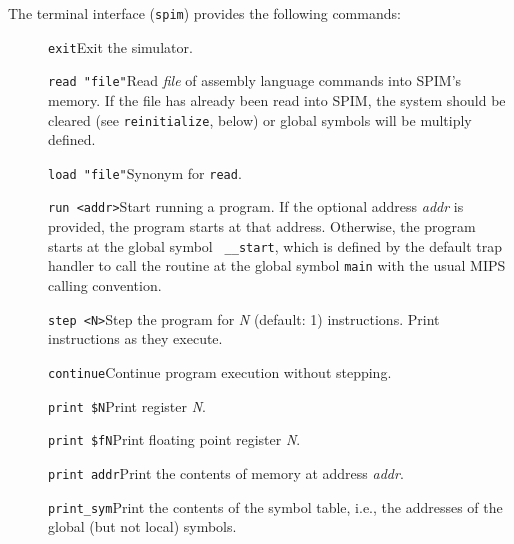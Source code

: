 The terminal interface ({\tt spim}) provides the following commands:
\begin{description}
  \item [] {\tt exit}\newline Exit the simulator.

  \item [] {\tt read "file"}\newline Read {\em file\/} of assembly
language commands into SPIM's memory.  If the file has already been
read into SPIM, the system should be cleared (see {\tt reinitialize},
below) or global symbols will be multiply defined.

  \item [] {\tt load "file"}\newline Synonym for {\tt read}.

  \item [] {\tt run <addr>}\newline Start running a program.  If the
optional address {\em addr\/} is provided, the program starts at that
address.  Otherwise, the program starts at the global symbol {\tt
\_\_start}, which is defined by the default trap handler to call the
routine at the global symbol {\tt main} with the usual MIPS calling
convention.

  \item [] {\tt step <N>}\newline Step the program for {\em N\/}
(default: 1) instructions.  Print instructions as they execute.

  \item [] {\tt continue}\newline Continue program execution without
stepping.

  \item [] {\tt print \$N}\newline Print register {\em N\/}.

  \item [] {\tt print \$fN}\newline Print floating point register {\em
N\/}.

  \item [] {\tt print addr}\newline Print the contents of memory at
address {\em addr\/}.

  \item [] {\tt print\_sym}\newline Print the contents of the symbol
table, i.e., the addresses of the global (but not local) symbols.


\end{description}
